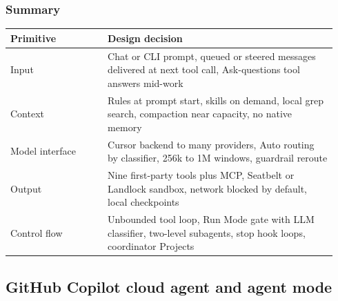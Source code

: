 \subsubsection*{Summary}
\begin{longtable}{@{}p{0.28\linewidth}p{0.66\linewidth}@{}}
\toprule \textbf{Primitive} & \textbf{Design decision} \\ \midrule \endhead
Input & Chat or CLI prompt, queued or steered messages delivered at next tool call, Ask-questions tool answers mid-work \\
Context & Rules at prompt start, skills on demand, local grep search, compaction near capacity, no native memory \\
Model interface & Cursor backend to many providers, Auto routing by classifier, 256k to 1M windows, guardrail reroute \\
Output & Nine first-party tools plus MCP, Seatbelt or Landlock sandbox, network blocked by default, local checkpoints \\
Control flow & Unbounded tool loop, Run Mode gate with LLM classifier, two-level subagents, stop hook loops, coordinator Projects \\
\bottomrule \end{longtable}


\subsection{GitHub Copilot cloud agent and agent mode}

